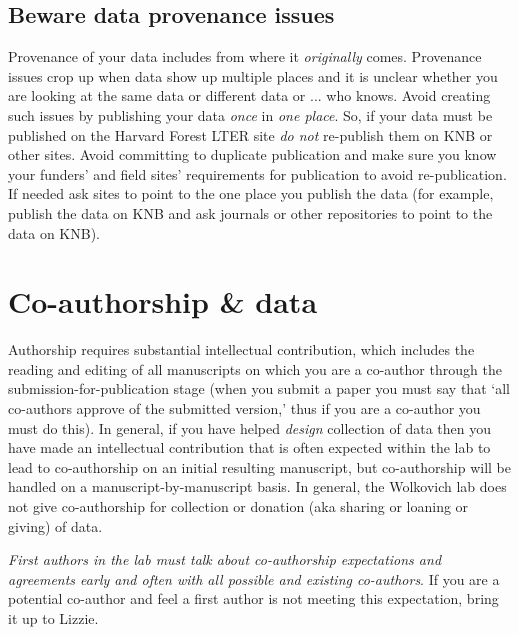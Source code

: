 \documentclass[11pt,a4paper,oneside]{article}
\begin{document}
\subsection{Beware data provenance issues}
Provenance of your data includes from where it \emph{originally} comes. Provenance issues crop up when data show up multiple places and it is unclear whether you are looking at the same data or different data or ... who knows. Avoid creating such issues by publishing your data \emph{once} in \emph{one place}. So, if your data must be published on the Harvard Forest LTER site \emph{do not} re-publish them on KNB or other sites. Avoid committing to duplicate publication and make sure you know your funders' and field sites' requirements for publication to avoid re-publication. If needed ask sites to point to the one place you publish the data (for example, publish the data on KNB and ask journals or other repositories to point to the data on KNB).

\section{Co-authorship \& data}
Authorship requires substantial intellectual contribution, which includes the reading and editing of all manuscripts on which you are a co-author through the submission-for-publication stage (when you submit a paper you must say that `all co-authors approve of the submitted version,' thus if you are a co-author you must do this). In general, if you have helped \emph{design} collection of data then you have made an intellectual contribution that is often expected within the lab to lead to co-authorship on an initial resulting manuscript, but co-authorship will be handled on a manuscript-by-manuscript basis. In general, the Wolkovich lab does not give co-authorship for collection or donation (aka sharing or loaning or giving) of data. 

\emph{First authors in the lab must talk about co-authorship expectations and agreements early and often with all possible and existing co-authors}. If you are a potential co-author and feel a first author is not meeting this expectation, bring it up to Lizzie.
\end{document}
